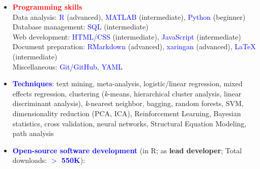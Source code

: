 \documentclass[10pt]{article}
\begin{document}
	\begin{itemize}
	\item \textcolor{red}{\textbf{Programming skills}}\\
	 Data analysis: \textcolor{blue}{R} (advanced), \textcolor{blue}{MATLAB} (intermediate), \textcolor{blue}{Python} (beginner)\\
	 
	 Database management: \textcolor{blue}{SQL} (intermediate)\\
	 
	 Web development: \textcolor{blue}{HTML/CSS} (intermediate), \textcolor{blue}{JavaScript} (intermediate)\\
		Document preparation: \textcolor{blue}{RMarkdown} (advanced), \textcolor{blue}{xaringan} (advanced), \textcolor{blue}{\LaTeX{}} (intermediate)\\
		
	 Miscellaneous: \textcolor{blue}{Git/GitHub}, \textcolor{blue}{YAML} 
	

	\item \textcolor{blue}{\textbf{Techniques}}: text mining, meta-analysis, logistic/linear regression, mixed effects regression, clustering (\textit{k}-means, hierarchical cluster analysis, linear discriminant analysis), \textit{k}-nearest neighbor, bagging, random forests, SVM, dimensionality reduction (PCA, ICA), Reinforcement Learning, Bayesian statistics, cross validation, neural networks, Structural Equation Modeling, path analysis
	
	
	\item \textcolor{blue}{\textbf{Open-source software development}} (in R; as \textbf{lead developer}; Total downloads: \textcolor{blue}{\textbf{$>$ 550K}}):
	 \vspace*{-0.09in}
	 
	\begin{itemize}
	

\end{itemize}
\end{itemize}
\end{document}
